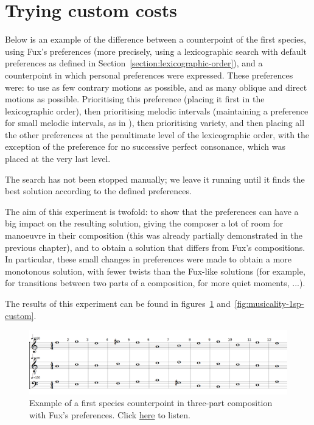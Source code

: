 \section{Trying custom costs}
Below is an example of the difference between a counterpoint of the first species, using Fux's preferences (more precisely, using a lexicographic search with default preferences as defined in Section~\ref{section:lexicographic-order}), and a counterpoint in which personal preferences were expressed. These preferences were: to use as few contrary motions as possible, and as many oblique and direct motions as possible. Prioritising this preference (placing it first in the lexicographic order), then prioritising melodic intervals (maintaining a preference for small melodic intervals, as in \gap), then prioritising variety, and then placing all the other preferences at the penultimate level of the lexicographic order, with the exception of the preference for no successive perfect consonance, which was placed at the very last level.

The search has not been stopped manually; we leave it running until it finds the best solution according to the defined preferences.

The aim of this experiment is twofold: to show that the preferences can have a big impact on the resulting solution, giving the composer a lot of room for manoeuvre in their composition (this was already partially demonstrated in the previous chapter), and to obtain a solution that differs from Fux's compositions. In particular, these small changes in preferences were made to obtain a more monotonous solution, with fewer twists than the Fux-like solutions (for example, for transitions between two parts of a composition, for more quiet moments, ...).

The results of this experiment can be found in figures~\ref{fig:musicality-1sp-fux} and~\ref{fig:musicality-1sp-custom}.
\begin{figure}[h!]
    \centering
    \includegraphics[width=1\textwidth]{Images/Musicality/musicality-1sp-fux-pref.png}
    \caption{Example of a first species counterpoint in three-part composition with Fux's preferences. Click \href{https://youtu.be/rXGOzidniA0}{here} to listen.}
    \label{fig:musicality-1sp-fux}
\end{figure}

